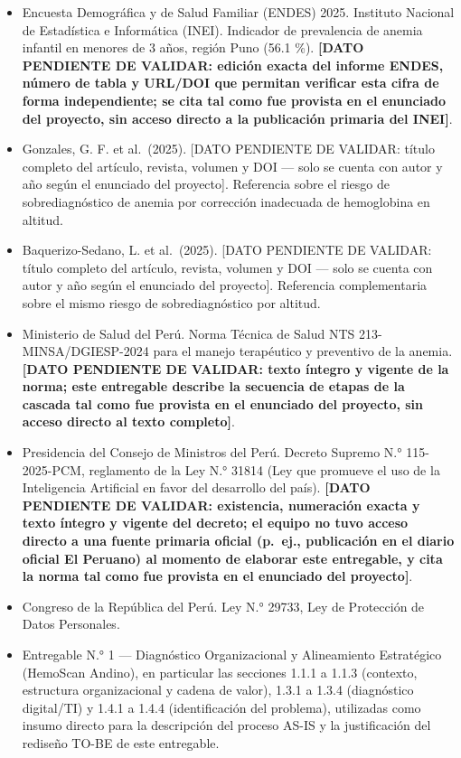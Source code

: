 \documentclass[11pt,a4paper]{article}
\providecommand{\tightlist}{%
  \setlength{\itemsep}{0pt}\setlength{\parskip}{0pt}}
\begin{document}
\begin{itemize}
\tightlist
\item
  Encuesta Demográfica y de Salud Familiar (ENDES) 2025. Instituto Nacional de Estadística e Informática (INEI). Indicador de prevalencia de anemia infantil en menores de 3 años, región Puno (56.1 \%). \textbf{{[}DATO PENDIENTE DE VALIDAR: edición exacta del informe ENDES, número de tabla y URL/DOI que permitan verificar esta cifra de forma independiente; se cita tal como fue provista en el enunciado del proyecto, sin acceso directo a la publicación primaria del INEI{]}}.
\item
  Gonzales, G. F. et al.~(2025). {[}DATO PENDIENTE DE VALIDAR: título completo del artículo, revista, volumen y DOI --- solo se cuenta con autor y año según el enunciado del proyecto{]}. Referencia sobre el riesgo de sobrediagnóstico de anemia por corrección inadecuada de hemoglobina en altitud.
\item
  Baquerizo-Sedano, L. et al.~(2025). {[}DATO PENDIENTE DE VALIDAR: título completo del artículo, revista, volumen y DOI --- solo se cuenta con autor y año según el enunciado del proyecto{]}. Referencia complementaria sobre el mismo riesgo de sobrediagnóstico por altitud.
\item
  Ministerio de Salud del Perú. Norma Técnica de Salud NTS 213-MINSA/DGIESP-2024 para el manejo terapéutico y preventivo de la anemia. \textbf{{[}DATO PENDIENTE DE VALIDAR: texto íntegro y vigente de la norma; este entregable describe la secuencia de etapas de la cascada tal como fue provista en el enunciado del proyecto, sin acceso directo al texto completo{]}}.
\item
  Presidencia del Consejo de Ministros del Perú. Decreto Supremo N.° 115-2025-PCM, reglamento de la Ley N.° 31814 (Ley que promueve el uso de la Inteligencia Artificial en favor del desarrollo del país). \textbf{{[}DATO PENDIENTE DE VALIDAR: existencia, numeración exacta y texto íntegro y vigente del decreto; el equipo no tuvo acceso directo a una fuente primaria oficial (p.~ej., publicación en el diario oficial El Peruano) al momento de elaborar este entregable, y cita la norma tal como fue provista en el enunciado del proyecto{]}}.
\item
  Congreso de la República del Perú. Ley N.° 29733, Ley de Protección de Datos Personales.
\item
  Entregable N.° 1 --- Diagnóstico Organizacional y Alineamiento Estratégico (HemoScan Andino), en particular las secciones 1.1.1 a 1.1.3 (contexto, estructura organizacional y cadena de valor), 1.3.1 a 1.3.4 (diagnóstico digital/TI) y 1.4.1 a 1.4.4 (identificación del problema), utilizadas como insumo directo para la descripción del proceso AS-IS y la justificación del rediseño TO-BE de este entregable.
\end{itemize}
\end{document}
